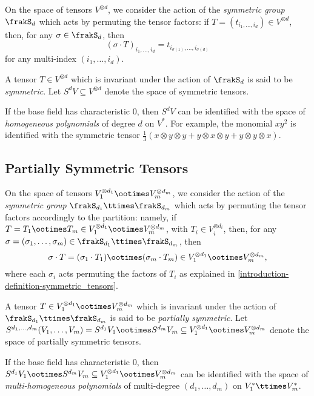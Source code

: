 On the space of tensors $V^{\otimes d}$, we consider the action of the \emph{symmetric group} $\frakS_d$ which acts by permuting the tensor factors: if $T = (t_{i_1,\ldots,i_d}) \in V^{\otimes d}$, then, for any $\sigma \in \frakS_d$, then \[(\sigma \cdot T)_{i_1,\ldots,i_d} = t_{i_{\sigma(1)},\ldots,i_{\sigma(d)}}\] for any multi-index $(i_1,\ldots,i_d)$. 
\begin{definition}
\label{introduction-definition-symmetric_tensors}
A tensor $T \in V^{\otimes d}$ which is invariant under the action of $\frakS_d$ is said to be \emph{symmetric}. Let $S^d V \subseteq V^{\otimes d}$ denote the space of symmetric tensors. 

If the base field has characteristic $0$, then $S^d V$ can be identified with the space of \emph{homogeneous polynomials} of degree $d$ on $V^*$. For example, the monomial $xy^2$ is identified with the symmetric tensor $\frac{1}{3}\left(x\otimes y \otimes y + y\otimes x \otimes y + y\otimes y \otimes x\right)$.
\end{definition}

\subsection{Partially Symmetric Tensors}
\label{introduction-subsection-partially_symmetric_tensors}
On the space of tensors $V_1^{\otimes d_1}\ootimes V_m^{\otimes d_m}$, we consider the action of the \emph{symmetric group} $\frakS_{d_1} \ttimes \frakS_{d_m}$ which acts by permuting the tensor factors accordingly to the partition: namely, if $T = T_1 \ootimes T_m \in V_1^{\otimes d_1}\ootimes V_m^{\otimes d_m}$, with $T_i \in V_i^{\otimes d_i}$, then, for any $\sigma = (\sigma_1,\ldots,\sigma_m)\in \frakS_{d_1} \ttimes \frakS_{d_m}$, then \[\sigma \cdot T = (\sigma_1\cdot T_1) \ootimes (\sigma_m\cdot T_m) \in V_1^{\otimes d_1}\ootimes V_m^{\otimes d_m},\] where each $\sigma_i$ acts permuting the factors of $T_i$ as explained in \ref{introduction-definition-symmetric_tensors}.

\begin{definition}
\label{introduction-definition-partially_symmetric_tensors}    
A tensor $T \in V_1^{\otimes d_1}\ootimes V_m^{\otimes d_m}$ which is invariant under the action of $\frakS_{d_1} \ttimes \frakS_{d_m}$ is said to be \emph{partially symmetric}. Let $S^{d_1,\ldots,d_m}(V_1,\ldots,V_m) = S^{d_1} V_1 \ootimes S^{d_m}V_m \subseteq V_1^{\otimes d_1}\ootimes V_m^{\otimes d_m}$ denote the space of partially symmetric tensors. 

If the base field has characteristic $0$, then $S^{d_1} V_1 \ootimes S^{d_m}V_m \subseteq V_1^{\otimes d_1}\ootimes V_m^{\otimes d_m}$ can be identified with the space of \emph{multi-homogeneous polynomials} of multi-degree $(d_1,\ldots,d_m)$ on $V^*_1 \ttimes V^*_m$. 
\end{definition}

